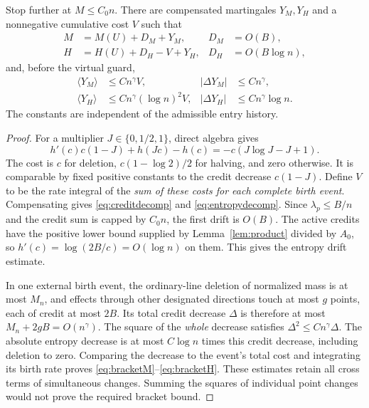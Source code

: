 \begin{lemma}\label{lem:entropy}
Stop further at \(M\le C_0n\). There are compensated martingales
\(Y_M,Y_H\) and a nonnegative cumulative cost \(V\) such that
\begin{align}
 M&=M(U)+D_M+Y_M,&D_M&=O(B),\label{eq:creditdecomp}\\
 H&=H(U)+D_H-V+Y_H,&D_H&=O(B\log n),\label{eq:entropydecomp}
\end{align}
and, before the virtual guard,
\begin{align}
 \langle Y_M\rangle&\le C n^\gamma V,
 &|\Delta Y_M|&\le C n^\gamma,\label{eq:bracketM}\\
 \langle Y_H\rangle&\le C n^\gamma(\log n)^2V,
 &|\Delta Y_H|&\le C n^\gamma\log n.\label{eq:bracketH}
\end{align}
The constants are independent of the admissible entry history.
\end{lemma}
\begin{proof}
For a multiplier \(J\in\{0,1/2,1\}\), direct algebra gives
\[
 h'(c)c(1-J)+h(Jc)-h(c)=-c(J\log J-J+1).
\]
The cost is \(c\) for deletion, \(c(1-\log2)/2\) for halving,
and zero otherwise. It is comparable by fixed positive constants
to the credit decrease \(c(1-J)\). Define \(V\) to be the rate
integral of the \emph{sum of these costs for each complete birth
event}. Compensating gives \eqref{eq:creditdecomp} and
\eqref{eq:entropydecomp}. Since \(\lambda_p\le B/n\) and the
credit sum is capped by \(C_0n\), the first drift is \(O(B)\).
The active credits have the positive lower bound supplied by
Lemma~\ref{lem:product} divided by \(A_0\), so
\(h'(c)=\log(2B/c)=O(\log n)\) on them. This gives the entropy
drift estimate.

In one external birth event, the ordinary-line deletion of normalized
mass is at most \(M_n\), and effects through other designated
directions touch at most \(g\) points, each of credit at most \(2B\).
Its total credit decrease \(\Delta\) is therefore at most
\(M_n+2gB=O(n^\gamma)\). The square of the \emph{whole} decrease
satisfies \(\Delta^2\le C n^\gamma\Delta\).
The absolute entropy decrease is at most \(C\log n\) times this
credit decrease, including deletion to zero. Comparing the decrease
to the event's total cost and integrating its birth rate proves
\eqref{eq:bracketM}--\eqref{eq:bracketH}. These estimates retain
all cross terms of simultaneous changes. Summing the squares of
individual point changes would not prove the required bracket bound.
\end{proof}

